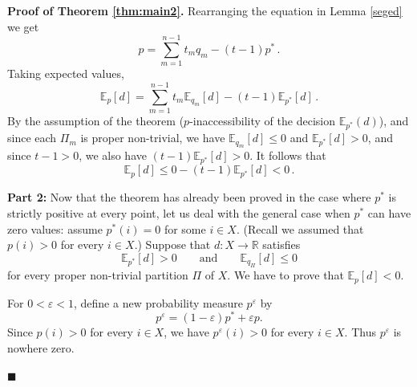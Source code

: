 \documentclass[10pt, letterpaper]{article}%
\theoremstyle{definition}
\renewenvironment{proof}[1][\unskip]{%
\par
\noindent
\textbf{Proof #1.}
\noindent}
{\hfill$\blacksquare$

\bigskip}
\newcommand{\E}{\mathbb E}
\newcommand{\1}{\mathbf 1}
\def\change{\marginpar[\hfill Change]{Change}}
\begin{document}
\begin{proof}[of Theorem \ref{thm:main2}]
	\noindent Rearranging the equation in Lemma \ref{seged} we get
	\[
		p = \sum_{m=1}^{n-1}t_m q_m - (t-1) p^*\,.
	\]
	Taking expected values,
	\[
		\E_{p}[d] = \sum_{m=1}^{n-1}t_m \E_{q_m}[d] - (t-1) \E_{p^*}[d]\,.
	\]
	By the assumption of the theorem ($p$-inaccessibility of the decision $\E_{p^*}(d)$), %
    and since each $\Pi_m$
	is proper non-trivial, we have $\E_{q_m}[d]\leq 0$ and $\E_{p^*}[d]>0$, and since $t-1>0$, we also
	have $(t-1)\E_{p^*}[d] > 0$. It follows that
	\[
		\E_{p}[d] \leq 0 - (t-1)\E_{p^*}[d] < 0\,.
	\]
    
    {\bf Part 2:} 
    Now that the theorem has already been proved in the case where $p^*$ is strictly positive at every point, let us deal with the general case when $p^*$ can have zero values: assume  $p^*(i)=0$ for some $i\in X$. (Recall we assumed that $p(i)>0$ for every $i\in X$.) Suppose that $d:X\to\mathbb R$ satisfies
    \[
        \E_{p^*}[d]>0\qquad\text{and}\qquad
        \E_{q_\Pi}[d]\leq 0
    \]
    for every proper non-trivial partition $\Pi$ of $X$. We have to prove that $\E_p[d]<0$. 
    
    For $0<\varepsilon<1$, define a new probability measure $p^\varepsilon$ by
    \[
        p^\varepsilon=(1-\varepsilon)p^*+\varepsilon p.
    \]
    Since $p(i)>0$ for every $i\in X$, we have $p^\varepsilon(i)>0$ for every $i\in X$. Thus $p^\varepsilon$ is nowhere zero.


\end{proof}
\end{document}
